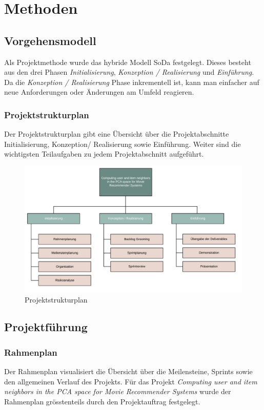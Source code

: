 \chapter{Methoden}

\section{Vorgehensmodell}

Als Projektmethode wurde das hybride Modell SoDa festgelegt. Dieses besteht aus den drei Phasen \textit{Initialisierung}, \textit{Konzeption / Realisierung} und \textit{Einführung}. Da die  \textit{Konzeption / Realisierung} Phase inkrementell ist, kann man einfacher auf neue Anforderungen oder Änderungen am Umfeld reagieren. \cite{sodawebpage}

\subsection{Projektstrukturplan}
\label{ch:Projektstrukturplan}
Der Projektstrukturplan gibt eine Übersicht über die Projektabschnitte Initialisierung, Konzeption/ Realisierung sowie Einführung. Weiter sind die wichtigsten Teilaufgaben zu jedem Projektabschnitt aufgeführt.
\begin{figure}[htb]
	\centering
	\includegraphics[keepaspectratio,width=\linewidth]{img/Projektstrukturplan.png}
	\caption{Projektstrukturplan}
	\label{fig:Projektstrukturplan}
\end{figure}


\section{Projektführung}

\subsection{Rahmenplan}
Der Rahmenplan visualisiert die Übersicht über die Meilensteine, Sprints sowie den allgemeinen Verlauf des Projekts. Für das Projekt \textit{Computing user and item neighbors in the PCA space for Movie Recommender Systems} wurde der Rahmenplan grösstenteils durch den Projektauftrag festgelegt.

